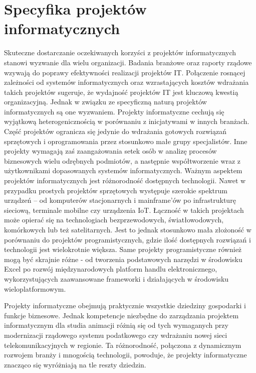 \newpage
\section{Specyfika projektów informatycznych}
Skuteczne dostarczanie oczekiwanych korzyści z projektów informatycznych stanowi wyzwanie dla wielu organizacji\autocite{robey}. Badania branżowe\autocite{rubinstein} oraz raporty rządowe \autocite{canada}\autocite{gov} wzywają do poprawy efektywności realizacji projektów IT.
Połączenie rosnącej zależności od systemów informatycznych oraz wzrastających kosztów wdrażania takich projektów sugeruje, że wydajność projektów IT jest kluczową kwestią organizacyjną.\autocite{ryzyka} Jednak w związku ze specyficzną naturą projektów informatycznych są one wyzwaniem. Projekty informatyczne cechują się wyjątkową heterogenicznością w porównaniu z inicjatywami w innych branżach. Część projektów ogranicza się jedynie do wdrażania gotowych rozwiązań sprzętowych i oprogramowania przez stosunkowo małe grupy specjalistów. Inne projekty wymagają zaś zaangażowania setek osób w analizę procesów biznesowych wielu odrębnych podmiotów, a następnie współtworzenie wraz z użytkownikami dopasowanych systemów informatycznych. Ważnym aspektem projektów informatycznych jest różnorodność dostępnych technologii. Nawet w przypadku prostych projektów sprzętowych występuje szerokie spektrum urządzeń – od komputerów stacjonarnych i mainframe’ów po infrastrukturę sieciową, terminale mobilne czy urządzenia IoT. Łączność w takich projektach może opierać się na technologiach bezprzewodowych, światłowodowych, komórkowych lub też satelitarnych. Jest to jednak stosunkowo mała złożoność w porównaniu do projektów programistycznych, gdzie ilość dostępnych rozwiązań i technologii jest wielokrotnie większa. Same projekty programistyczne również mogą być skrajnie różne - od tworzenia podstawowych narzędzi w środowisku Excel po rozwój międzynarodowych platform handlu elektronicznego, wykorzystujących zaawansowane frameworki i działających w środowisku wieloplatformowym.

Projekty informatyczne obejmują praktycznie wszystkie dziedziny gospodarki i funkcje biznesowe. Jednak kompetencje niezbędne do zarządzania projektem informatycznym dla studia animacji różnią się od tych wymaganych przy modernizacji rządowego systemu podatkowego czy wdrażaniu nowej sieci telekomunikacyjnych w regionie. Ta różnorodność, połączona z dynamicznym rozwojem branży i mnogością technologii, powoduje, że projekty informatyczne znacząco się wyróżniają na tle reszty dziedzin. \autocite{ITPM}


